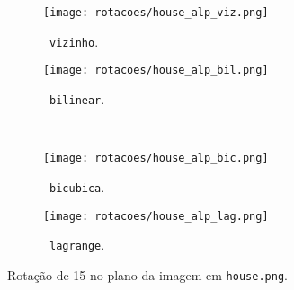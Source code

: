 \begin{figure}[H]
    \centering\hfill
    \begin{subfigure}{0.4\textwidth}
        \centering
        \texttt{[image: rotacoes/house\_alp\_viz.png]}
        \caption{~\texttt{vizinho}.}
    \end{subfigure}%
    \hfill%
    \begin{subfigure}{0.4\textwidth}
        \centering
        \texttt{[image: rotacoes/house\_alp\_bil.png]}
        \caption{~\texttt{bilinear}.}
    \end{subfigure}\hfill
    \\[8pt]\hfill
    \begin{subfigure}{0.4\textwidth}
        \centering
        \texttt{[image: rotacoes/house\_alp\_bic.png]}
        \caption{~\texttt{bicubica}.}
    \end{subfigure}%
    \hfill%
    \begin{subfigure}{0.4\textwidth}
        \centering
        \texttt{[image: rotacoes/house\_alp\_lag.png]}
        \caption{~\texttt{lagrange}.}
    \end{subfigure}\hfill

    \caption{Rotação de 15\textdegree{} no plano da imagem em \texttt{house.png}.}
\end{figure}